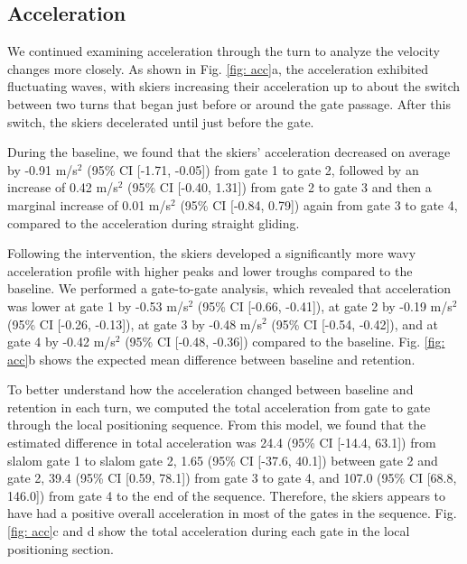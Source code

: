 \documentclass{article}
\begin{document}
\subsection{Acceleration}
We continued examining acceleration through the turn to analyze the velocity changes more closely. As shown in Fig. \ref{fig: acc}a, the acceleration exhibited fluctuating waves, with skiers increasing their acceleration up to about the switch between two turns that began just before or around the gate passage. After this switch, the skiers decelerated until just before the gate. 

During the baseline, we found that the skiers' acceleration decreased on average by -0.91 m/s$^2$ (95\% CI [-1.71, -0.05]) from gate 1 to gate 2, followed by an increase of 0.42 m/s$^2$ (95\% CI [-0.40, 1.31]) from gate 2 to gate 3 and then a marginal increase of 0.01 m/s$^2$ (95\% CI [-0.84, 0.79]) again from gate 3 to gate 4, compared to the acceleration during straight gliding.

Following the intervention, the skiers developed a significantly more wavy acceleration profile with higher peaks and lower troughs compared to the baseline. We performed a gate-to-gate analysis, which revealed that acceleration was lower at gate 1 by -0.53  m/s$^2$ (95\% CI [-0.66, -0.41]), at gate 2 by -0.19  m/s$^2$ (95\% CI [-0.26, -0.13]), at gate 3 by -0.48  m/s$^2$ (95\% CI [-0.54, -0.42]), and at gate 4 by -0.42  m/s$^2$  (95\% CI [-0.48, -0.36]) compared to the baseline. Fig. \ref{fig: acc}b shows the expected mean difference between baseline and retention. 

To better understand how the acceleration changed between baseline and retention in each turn, we computed the total acceleration from gate to gate through the local positioning sequence. From this model, we found that the estimated difference in total acceleration was 24.4 (95\% CI [-14.4, 63.1]) from slalom gate 1 to slalom gate 2, 1.65 (95\% CI [-37.6, 40.1]) between gate 2 and gate 2, 39.4 (95\% CI [0.59, 78.1]) from gate 3 to gate 4, and 107.0 (95\% CI [68.8, 146.0]) from gate 4 to the end of the sequence. Therefore, the skiers appears to have had a positive overall acceleration in most of the gates in the sequence. Fig. \ref{fig: acc}c and d show the total acceleration during each gate in the local positioning section.
\end{document}
